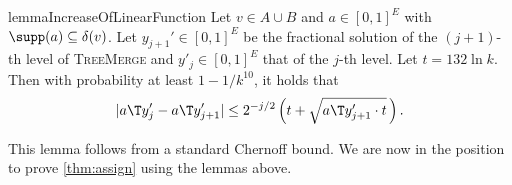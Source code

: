 \documentclass[a4paper,USenglish,cleveref,thm-restate]{lipics-v2021}
\begin{document}
\begin{restatable}{lemma}{IncreaseOfLinearFunction}
    \label{lem:linear-function-increase-per-level}
    Let $v\in A\cup B$ and $a \in [0, 1]^E$ with $\supp(a) \subseteq \delta(v)$.
    Let $y_{j+1}' \in [0,1]^E$
    be the fractional solution of the $(j+1)$-th
    level of \textsc{TreeMerge}
    and $y'_{j}\in [0,1]^E$
    that of the $j$-th level.
    Let $t= 132 \ln k$.
    Then with probability at least $1 - 1/k^{10}$, it holds that
    \begin{equation}
        \label{eq:lfipl-bound-on-lf-increase}
        |a\T y_j' - a\T y_{j+1}'| \le 2^{-j/2} \left(t + \sqrt{a\T y_{j+1}' \cdot t}\,\right).
    \end{equation}
\end{restatable}
This lemma follows from a standard Chernoff bound.
We are now in the position to prove \cref{thm:assign} using the lemmas above.
\end{document}
